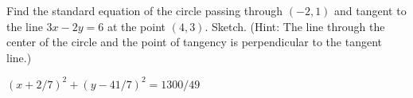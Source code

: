 \begin{enumialphparenastyle}
\begin{multicols}{2}
\begin{ex} 
Find the standard equation of the circle passing through $(-2,1)$
 and tangent to the line $3x-2y =6$ at the point $(4,3)$.  Sketch. 
 (Hint: The line through the center of the circle and the point of tangency
 is perpendicular to the tangent line.)
\begin{sol}
$(x+2/7)^2+(y-41/7)^2=1300/49$
\end{sol}
\end{ex}

\end{multicols}

\end{enumialphparenastyle}